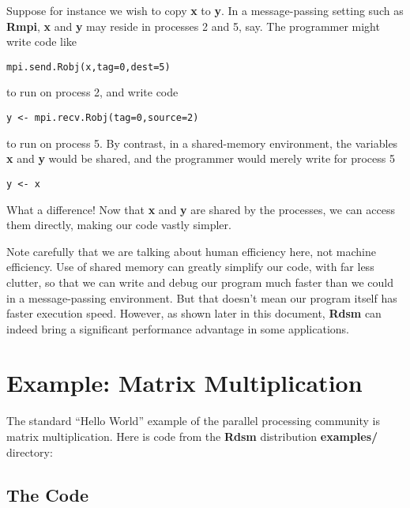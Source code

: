 \documentclass[11pt]{article}
\begin{document}
Suppose for instance we wish to copy \textbf{x} to \textbf{y}.  In a
message-passing setting such as \textbf{Rmpi}, \textbf{x} and \textbf{y}
may reside in processes 2 and 5, say.  The programmer might write code
like

\begin{lstlisting}
mpi.send.Robj(x,tag=0,dest=5)
\end{lstlisting}

to run on process 2, and write code

\begin{lstlisting}
y <- mpi.recv.Robj(tag=0,source=2)
\end{lstlisting}

to run on process 5.  By contrast, in a shared-memory environment, the
variables {\bf x} and {\bf y} would be shared, and the programmer would
merely write for process 5

\begin{lstlisting}
y <- x
\end{lstlisting}

What a difference!  Now that  {\bf x} and {\bf y} are shared by the
processes, we can access them directly, making our code vastly simpler.

Note carefully that we are talking about human efficiency here, not
machine efficiency.  Use of shared memory can greatly simplify our code,
with far less clutter, so that we can write and debug our program much
faster than we could in a message-passing environment.  But that doesn't
mean our program itself has faster execution speed.  However, as shown
later in this document, {\bf Rdsm} can indeed bring a significant
performance advantage in some applications.

\section{Example:  Matrix Multiplication}
\label{matmul}

The standard ``Hello World'' example of the parallel processing
community is matrix multiplication.  Here is code from the {\bf Rdsm}
distribution {\bf examples/} directory:

\subsection{The Code}
\end{document}
